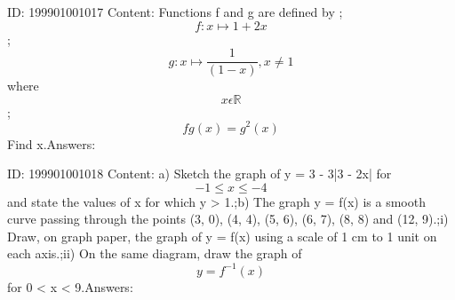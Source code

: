 \documentclass{article}
\begin{document}
ID: 199901001017
Content:
Functions f and g are defined by ; \[f:x \mapsto 1+2x\] ; \[g:x \mapsto \frac{1}{(1-x)},x\neq 1\] where  \[x\epsilon \mathbb{R}\]; \[fg(x)=g^2(x)\] Find x.Answers:

ID: 199901001018
Content:
a) Sketch the graph of y = 3 - 3|3 - 2x| for \[-1\leq x\leq -4\] and state the values of x for which y > 1.;b) The graph y = f(x) is a smooth curve passing through the points (3, 0), (4, 4), (5, 6), (6, 7), (8, 8) and (12, 9).;i) Draw, on graph paper, the graph of y = f(x) using a scale of 1 cm to 1 unit on each axis.;ii) On the same diagram, draw the graph of $$y =f^{-1}(x)$$ for 0 < x < 9.Answers:
\end{document}
